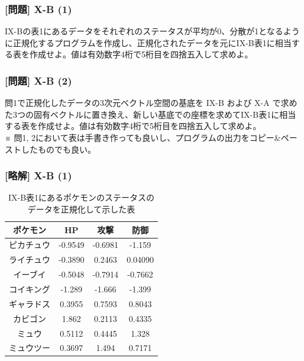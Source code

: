 \documentclass[dvipdfmx,aspectratio=169,20pt]{beamer}
\newcommand{\myfontsetting}[3]{{\fontsize{#1}{#2}\selectfont #3}}
\begin{document}
\begin{frame}
\frametitle{[問題] X-B (1)}

\myfontsetting{18pt}{20pt}{
I\hspace{-.1em}X-Bの表1にあるデータをそれぞれのステータスが平均が0、分散が1となるように正規化するプログラムを作成し、正規化されたデータを元にI\hspace{-.1em}X-B表1に相当する表を作成せよ。値は有効数字4桁で5桁目を四捨五入して求めよ。%
}
\end{frame}
\begin{frame}
\frametitle{[問題] X-B (2)}

\myfontsetting{18pt}{20pt}{
問1で正規化したデータの3次元ベクトル空間の基底を I\hspace{-.1em}X-B および X-A で求めた3つの固有ベクトルに置き換え、新しい基底での座標を求めてI\hspace{-.1em}X-B表1に相当する表を作成せよ。値は有効数字4桁で5桁目を四捨五入して求めよ。%
}\\
\myfontsetting{12pt}{12pt}{
※ 問1, 2において表は手書き作っても良いし、プログラムの出力をコピー\&ペーストしたものでも良い。
}
\end{frame}
\begin{frame}
\frametitle{[略解] X-B (1)}

\myfontsetting{12pt}{12pt}{
\begin{table}[htbp]
    \centering
\begin{tabular}{|c||c|c|c|}
\hline
ポケモン & HP & 攻撃 & 防御\\
\hline
ピカチュウ	& -0.9549	& -0.6981	& -1.159\\
ライチュウ	& -0.3890	& 0.2463	& 0.04090\\
イーブイ	& -0.5048	& -0.7914	& -0.7662\\
コイキング	& -1.289	& -1.666	& -1.399\\
ギャラドス	&  0.3955	& 0.7593	& 0.8043\\
カビゴン	&  1.862	& 0.2113	& 0.4335\\
ミュウ		&  0.5112	& 0.4445	& 1.328\\
ミュウツー	&  0.3697	& 1.494		& 0.7171\\
\hline
\end{tabular}
\caption{\myfontsetting{10pt}{10pt}{
I\hspace{-.1em}X-B表1にあるポケモンのステータスのデータを正規化して示した表
}}
\end{table}
}

\end{frame}
\end{document}
